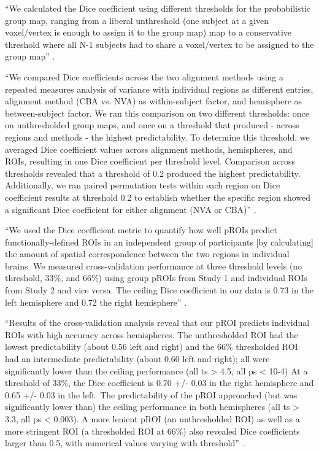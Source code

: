 ``We calculated the Dice coefficient using different thresholds for the
probabilistic group map, ranging from a liberal unthreshold (one subject at a
given voxel/vertex is enough to assign it to the group map) map to a
conservative threshold where all N-1 subjects had to share a voxel/vertex to be
assigned to the group map'' \citet{rosenke2021probabilistic}.

``We compared Dice coefficients across the two alignment methods using a
repeated measures analysis of variance with individual regions as different
entries, alignment method (CBA vs. NVA) as within-subject factor, and hemisphere
as between-subject factor.
%
We ran this comparison on two different thresholds:
%
once on unthresholded group maps, and once on a threshold that produced - across
regions and methods - the highest predictability.
%
To determine this threshold, we averaged Dice coefficient values across
alignment methods, hemispheres, and ROIs, resulting in one Dice coefficient per
threshold level.
%
Comparison across thresholds revealed that a threshold of 0.2 produced the
highest predictability.
%
Additionally, we ran paired permutation tests within each region on Dice
coefficient results at threshold 0.2 to establish whether the specific region
showed a significant Dice coefficient for either alignment (NVA or CBA)''
\citep{rosenke2021probabilistic}.


``We used the Dice coefficient metric to quantify how well pROIs predict
functionally-defined ROIs in an independent group of participants [by
calculating] the amount of spatial correspondence between the two regions in
individual brains.
%
We measured cross-validation performance at three threshold levels (no
threshold, 33\%, and 66\%) using group pROIs from Study 1 and individual ROIs
from Study 2 and vice versa.
%
The ceiling Dice coefficient in our data is 0.73 in the left hemisphere and 0.72
the right hemisphere'' \citep{weiner2018defining}.

``Results of the cross-validation analysis reveal that our pROI predicts
individual ROIs with high accuracy across hemispheres.
%
The unthresholded ROI had the lowest predictability (about 0.56 left and right)
and the 66\% thresholded ROI had an intermediate predictability (about 0.60 left
and right); all were significantly lower than the ceiling performance (all ts >
4.5, all ps < 10-4)
%
At a threshold of 33\%, the Dice coefficient is 0.70 +/- 0.03 in the right
hemisphere and 0.65 +/- 0.03 in the left.
%
The predictability of the pROI approached (but was significantly lower than) the
ceiling performance in both hemispheres (all ts > 3.3, all ps < 0.003).
%
A more lenient pROI (an unthresholded ROI) as well as a more stringent ROI (a
thresholded ROI at 66\%) also revealed Dice coefficients larger than 0.5, with
numerical values varying with threshold'' \citep{weiner2018defining}.


